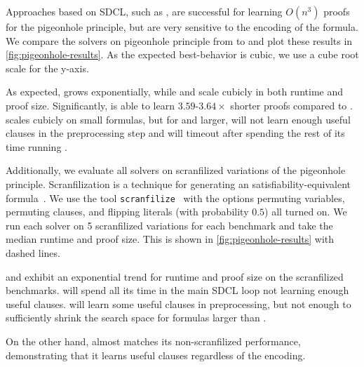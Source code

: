 Approaches based on SDCL, such as \sadical, are successful for learning $O(n^3)$
proofs for the pigeonhole principle, but are very sensitive to the encoding of
the formula. We compare the solvers on pigeonhole principle from  to
 and plot these results in \autoref{fig:pigeonhole-results}. As the
expected best-behavior is cubic, we use a cube root scale for the y-axis.

As expected, \cadical grows exponentially, while \sadical and \tool scale
cubicly in both runtime and proof size. Significantly, \tool is able to learn
$3.59$-$3.64\times$ shorter proofs compared to \sadical. 
\prelearn scales cubicly on small formulas, but for  and larger, will not
learn enough useful \pr clauses in the preprocessing step and will timeout after
spending the rest of its time running \cadical.


Additionally, we evaluate all solvers on scranfilized variations of the
pigeonhole principle. Scranfilization is a technique for generating an
satisfiability-equivalent formula~\cite{scranfilize}. We use the tool
\texttt{scranfilize}~\cite{scranfilize} with the options permuting variables,
permuting clauses, and flipping literals (with probability $0.5$) all turned on.
We run each solver on 5 scranfilized variations for each benchmark and take the
median runtime and proof size. This is shown in \autoref{fig:pigeonhole-results}
with dashed lines.

\sadical and \prelearn exhibit an exponential trend for runtime and proof size
on the scranfilized benchmarks. \sadical will spend all its time in the main
SDCL loop not learning enough useful clauses. \prelearn will learn some useful
\pr clauses in preprocessing, but not enough to sufficiently shrink the search
space for formulas larger than .

On the other hand, \tool almost matches its non-scranfilized performance,
demonstrating that it learns useful \pr clauses regardless of the encoding.




